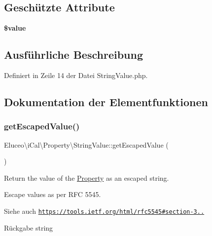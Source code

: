\subsection*{Geschützte Attribute}
\begin{DoxyCompactItemize}
\item 
\mbox{\label{class_eluceo_1_1i_cal_1_1_property_1_1_string_value_aabc1dfae21e354fc91795651a12d2538}} 
{\bfseries \$value}
\end{DoxyCompactItemize}


\subsection{Ausführliche Beschreibung}


Definiert in Zeile 14 der Datei String\+Value.\+php.



\subsection{Dokumentation der Elementfunktionen}
\mbox{\label{class_eluceo_1_1i_cal_1_1_property_1_1_string_value_a76f74785d3f3bd3533c40090d2340c01}} 
\subsubsection{\texorpdfstring{get\+Escaped\+Value()}{getEscapedValue()}\hspace{0.1cm}{\footnotesize\ttfamily [1/3]}}
{\footnotesize\ttfamily Eluceo\textbackslash{}i\+Cal\textbackslash{}\+Property\textbackslash{}\+String\+Value\+::get\+Escaped\+Value (\begin{DoxyParamCaption}{ }\end{DoxyParamCaption})}

Return the value of the \mbox{\hyperlink{class_eluceo_1_1i_cal_1_1_property}{Property}} as an escaped string.

Escape values as per R\+FC 5545.

\begin{DoxySeeAlso}{Siehe auch}
\href{https://tools.ietf.org/html/rfc5545#section-3.3.11}{\tt https\+://tools.\+ietf.\+org/html/rfc5545\#section-\/3..}
\end{DoxySeeAlso}
\begin{DoxyReturn}{Rückgabe}
string 
\end{DoxyReturn}


